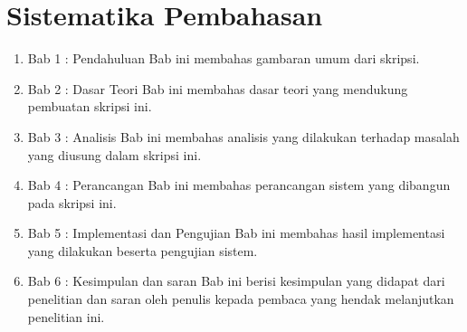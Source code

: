 
\section{Sistematika Pembahasan}
\label{sec:sispem}
\begin{enumerate}
\item Bab 1 : Pendahuluan
Bab ini membahas gambaran umum dari skripsi.
\item Bab 2 : Dasar Teori
Bab ini membahas dasar teori yang mendukung pembuatan skripsi ini.
\item Bab 3 : Analisis
Bab ini membahas analisis yang dilakukan terhadap masalah yang diusung dalam skripsi ini.
\item Bab 4 : Perancangan
Bab ini membahas perancangan sistem yang dibangun pada skripsi ini.
\item Bab 5 : Implementasi dan Pengujian
Bab ini membahas hasil implementasi yang dilakukan beserta pengujian sistem.
\item Bab 6 : Kesimpulan dan saran
Bab ini berisi kesimpulan yang didapat dari penelitian dan saran oleh penulis kepada pembaca yang hendak melanjutkan penelitian ini. 
\end{enumerate}

